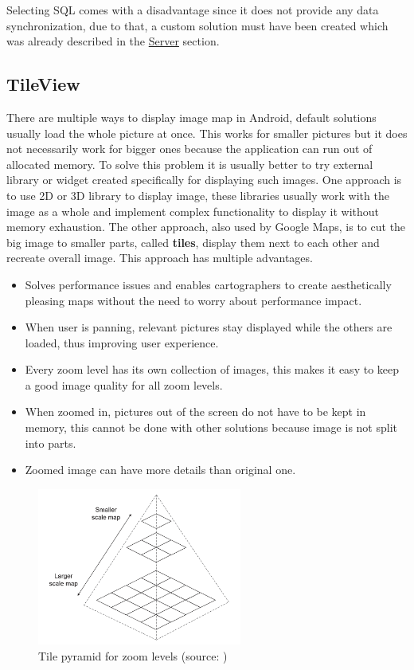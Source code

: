 Selecting SQL comes with a disadvantage since it does not provide any data synchronization, due to that, a custom solution must have been created which was already described in the \hyperref[sec:Server]{Server} section.

\subsection{TileView}\label{subsec:TileView}
There are multiple ways to display image map in Android, default solutions usually load the whole picture at once. This works for smaller pictures but it does not necessarily work for bigger ones because the application can run out of allocated memory. To solve this problem it is usually better to try external library or widget created specifically for displaying such images. One approach is to use 2D or 3D library to display image, these libraries usually work with the image as a whole and implement complex functionality to display it without memory exhaustion. The other approach, also used by Google Maps, is to cut the big image to smaller parts, called \textbf{tiles}, display them next to each other and recreate overall image. This approach has multiple advantages.

\begin{itemize}
	\item Solves performance issues and enables cartographers to create aesthetically pleasing maps without the need to worry about performance impact.
	\item When user is panning, relevant pictures stay displayed while the others are loaded, thus improving user experience.
	\item Every zoom level has its own collection of images, this makes it easy to keep a good image quality for all zoom levels.
	\item When zoomed in, pictures out of the screen do not have to be kept in memory, this cannot be done with other solutions because image is not split into parts.
	\item Zoomed image can have more details than original one.
\end{itemize}

\begin{figure}[H]
	\begin{centering}
		\includegraphics[width=0.6\textwidth]{img/tile_pyramid}
		\par\end{centering}
	\caption{Tile pyramid for zoom levels (source: \cite{WTM})\label{fig:TilePyramid}}
	\label{fig03c05}
\end{figure}

